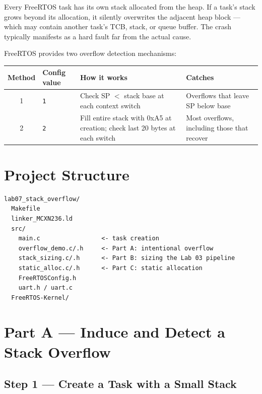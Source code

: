 \documentclass[11pt, a4paper]{article}
\begin{document}
Every FreeRTOS task has its own stack allocated from the heap. If a task's stack grows
beyond its allocation, it silently overwrites the adjacent heap block --- which may
contain another task's TCB, stack, or queue buffer. The crash typically manifests as a
hard fault far from the actual cause.

FreeRTOS provides two overflow detection mechanisms:

\renewcommand{\arraystretch}{1.3}
\begin{tabular}{@{} c p{2cm} p{5cm} p{3cm} @{}}
  \toprule
  \textbf{Method} & \textbf{Config value} & \textbf{How it works} & \textbf{Catches} \\
  \midrule
  1 & \texttt{1} & Check SP $<$ stack base at each context switch &
    Overflows that leave SP below base \\
  2 & \texttt{2} & Fill entire stack with 0xA5 at creation; check last 20 bytes at each switch &
    Most overflows, including those that recover \\
  \bottomrule
\end{tabular}
\renewcommand{\arraystretch}{1}

\section{Project Structure}

\begin{lstlisting}[style=textstyle]
lab07_stack_overflow/
  Makefile
  linker_MCXN236.ld
  src/
    main.c                 <- task creation
    overflow_demo.c/.h     <- Part A: intentional overflow
    stack_sizing.c/.h      <- Part B: sizing the Lab 03 pipeline
    static_alloc.c/.h      <- Part C: static allocation
    FreeRTOSConfig.h
    uart.h / uart.c
  FreeRTOS-Kernel/
\end{lstlisting}

\section{Part A --- Induce and Detect a Stack Overflow}

\subsection{Step 1 --- Create a Task with a Small Stack}
\end{document}

